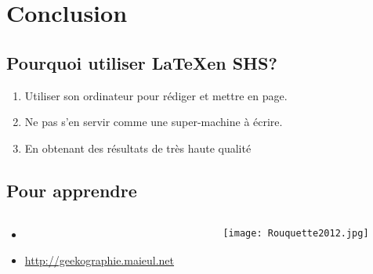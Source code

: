 \section{Conclusion}

\subsection{Pourquoi utiliser \LaTeX en SHS?}

\begin{slide}
  \begin{enumerate}
    \item Utiliser son ordinateur pour rédiger et mettre en page.
    \item Ne pas s'en servir comme une super-machine à écrire.
    \item En obtenant des résultats de très haute qualité
  \end{enumerate}
\end{slide}
\subsection{Pour apprendre}
\begin{slide}
  \beamerdefaultoverlayspecification{}
  \begin{columns}
    \begin{column}{.45\textwidth}
	\begin{itemize}
	  \item \cite{Rouquette2012}
	  \item \url{http://geekographie.maieul.net}
	\end{itemize}
    \end{column}
    \begin{column}{.45\textwidth}
      \texttt{[image: Rouquette2012.jpg]}
    \end{column}
  
  \end{columns}

\end{slide}
